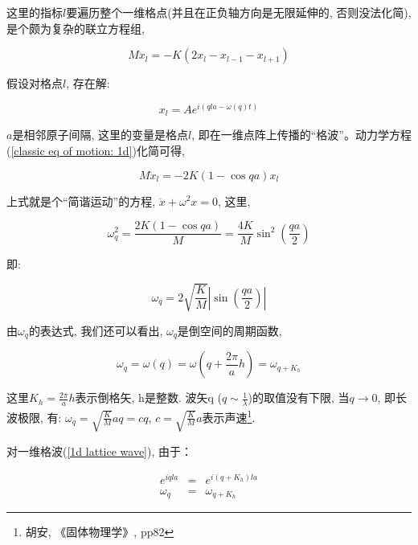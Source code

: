 这里的指标$l$要遍历整个一维格点(并且在正负轴方向是无限延伸的, 否则没法化简), 是个颇为复杂的联立方程组,

\begin{equation}\label{classic eq of motion: 1d}
M \ddot x_l = - K (2 x_l - x_{l-1} - x_{l+1})
\end{equation}


假设对格点$l$, 存在解:

\begin{equation}\label{1d lattice wave}
x_l = A e^{i( q l a  - \omega (q) t )}
\end{equation}

$a$是相邻原子间隔, 这里的变量是格点$l$,
即在一维点阵上传播的“格波”。动力学方程(\ref{classic eq of motion: 1d})化简可得,

\begin{equation*}
M \ddot x_l = - 2 K (1- \cos qa) x_l
\end{equation*}

上式就是个“简谐运动”的方程, $\ddot x + \omega^2 x =0$, 这里,

\begin{equation*}
\omega_q^2 = \frac{2K(1- \cos qa)}{M} = \frac{4K}{M} \sin^2 \left( \frac{qa}{2} \right)
\end{equation*}

即:

\begin{equation}\label{solution of 1d classic harmonics}
\omega_q = 2 \sqrt{\frac{K}{M}} \left| \sin \left( \frac{qa}{2}
\right) \right|
\end{equation}

由$\omega_q$的表达式, 我们还可以看出, $\omega_q$是倒空间的周期函数,

\begin{equation*}
\omega_q = \omega(q) = \omega(q + \frac{2\pi}{a} h)=\omega_{q + K_h}
\end{equation*}

这里$K_h = \frac{2\pi}{a} h$表示倒格矢, h是整数. 波矢q ($q \sim
\frac{1}{\lambda}$)的取值没有下限, 当$q \to 0$, 即长波极限, 有:
$\omega_q = \sqrt{\frac{K}{M}} a q = c q$, $c=\sqrt{\frac{K}{M} }
a$表示声速\footnote{胡安, 《固体物理学》, pp82}.

对一维格波(\ref{1d lattice wave}), 由于：

\begin{eqnarray*}
  e^{iqla} &=& e^{i(q + K_h)la} \\
  \omega_q &=& \omega_{q + K_h}
\end{eqnarray*}


